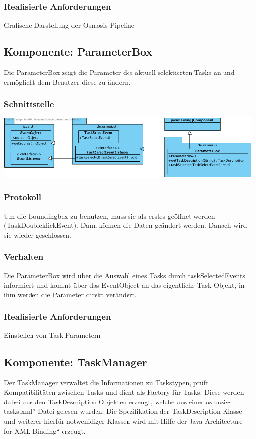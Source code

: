 \documentclass[a4paper,12pt]{scrartcl}
\begin{document}
\subsubsection{Realisierte Anforderungen}
Grafische Darstellung der Osmosis Pipeline

\subsection{Komponente: ParameterBox}
Die ParameterBox zeigt die Parameter des aktuell selektierten Tasks an und ermöglicht dem Benutzer diese zu ändern. 
\subsubsection{Schnittstelle}
\begin{center}
\includegraphics[width=17cm]{Schnittstelle_ParameterBox.png}
\end{center}
\subsubsection{Protokoll}
Um die Boundingbox zu benutzen, muss sie als erstes geöffnet werden (TaskDoubleklickEvent). Dann können die Daten geändert werden. Danach wird sie wieder geschlossen.
\subsubsection{Verhalten}
Die ParameterBox wird über die Auswahl eines Tasks durch taskSelectedEvents informiert und kommt über das EventObject an das eigentliche Task Objekt, in ihm werden die Parameter direkt verändert.
\subsubsection{Realisierte Anforderungen}
Einstellen von Task Parametern

\subsection{Komponente: TaskManager}
Der TaskManager verwaltet die Informationen zu Taskstypen, prüft Kompatibilitäten zwischen Tasks und dient als Factory für Tasks. Diese werden dabei aus den TaskDescription Objekten erzeugt, welche aus einer \glqq osmosis-tasks.xml'' Datei gelesen wurden. Die Spezifikation der TaskDescription Klasse und weiterer hierfür notwenidiger Klassen wird mit Hilfe
der \glqq Java Architecture for XML Binding`` erzeugt.
\end{document}
